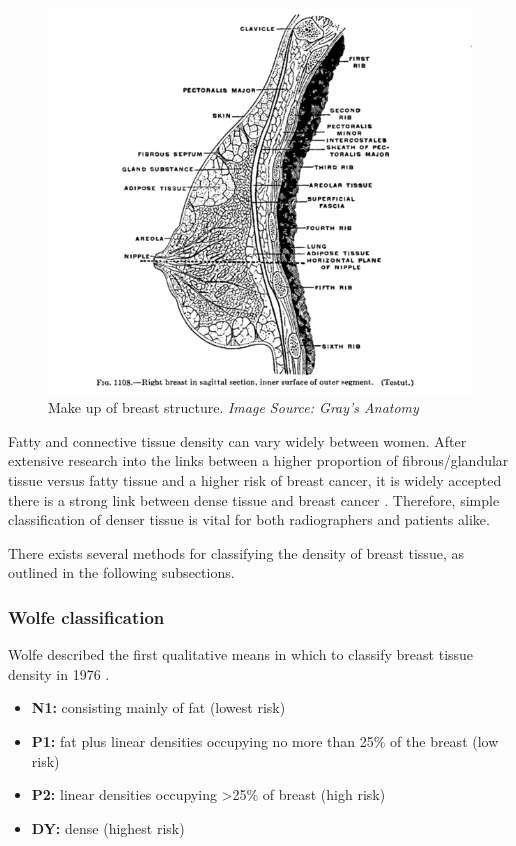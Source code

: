 \begin{figure}[!h]
  \center
  \includegraphics[scale=0.4]{Chapter1/background-img/breast_anatomy.png}
  \caption{Make up of breast structure. \textit{Image Source: Gray's Anatomy \cite{Gray_1907}}}
  \label{fig:breast-anatomy}
\end{figure}

Fatty and connective tissue density can vary widely between women. After extensive research into the links between a higher proportion of fibrous/glandular tissue versus fatty tissue and a higher risk of breast cancer, it is widely accepted there is a strong link between dense tissue and breast cancer \cite{Boyd_Byng_Jong_Fishell_Little_Miller_Lockwood_Tritchler_Yaffe_1995}. Therefore, simple classification of denser tissue is vital for both radiographers and patients alike.

There exists several methods for classifying the density of breast tissue, as outlined in the following subsections.

\subsubsection{Wolfe classification}

Wolfe described the first qualitative means in which to classify breast tissue density in 1976 \cite{Wolfe_1976}.

\begin{itemize}
    \item \textbf{N1:} consisting mainly of fat (lowest risk)
    \item \textbf{P1:} fat plus linear densities occupying no more than 25\% of the breast (low risk)
    \item \textbf{P2:} linear densities occupying \textgreater 25\% of breast (high risk)
    \item \textbf{DY:} dense (highest risk)
\end{itemize}

